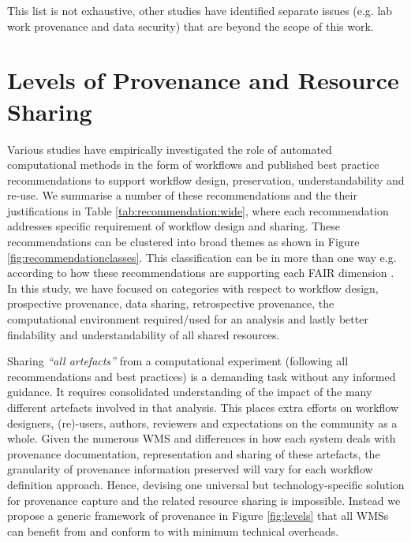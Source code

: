 \documentclass[a4paper,num-refs]{oup-contemporary}
\begin{document}
\begin{table}[!htbp]
\begin{tablenotes}
\item This list is not exhaustive, other studies have identified separate issues (e.g. lab work provenance and data security) that are beyond the scope of this work. 
\end{tablenotes}
\end{table}

\section{Levels of Provenance and Resource Sharing} \label{sec:levels}
Various studies have empirically investigated the role of automated computational methods in the form of workflows and published best practice recommendations to support workflow design, preservation, understandability and re-use. We summarise a number of these recommendations and the their justifications in Table \ref{tab:recommendation:wide}, where each recommendation addresses specific requirement of workflow design and sharing. These recommendations can be clustered into broad themes as shown in Figure \ref{fig:recommendationclasses}. This classification can be in more than one way e.g. according to how these recommendations are supporting each FAIR dimension \citep{wilkinson_2016}. In this study, we have focused on categories with respect to workflow design, prospective provenance, data sharing, retrospective provenance, the computational environment required/used for an analysis and lastly better findability and understandability of all shared resources. 

Sharing \textit{``all artefacts''} from a computational experiment (following all recommendations and best practices) is a demanding task without any informed guidance. It requires consolidated understanding of the impact of the many different artefacts involved in that analysis. This places extra efforts on workflow designers, (re)-users, authors, reviewers and expectations on the community as a whole. Given the numerous WMS and differences in how each system deals with provenance documentation, representation and sharing of these artefacts, the granularity of provenance information preserved will vary for each workflow definition approach. Hence, devising one universal but technology-specific solution for provenance capture and the related resource sharing is impossible. Instead we propose a generic framework of provenance in Figure \ref{fig:levels} that all WMSs can benefit from and conform to with minimum technical overheads.  
\end{document}
